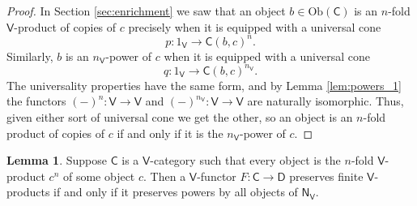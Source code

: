 \documentclass{amsart}
\theoremstyle{definition}
\newtheorem{lemma}[theorem]{Lemma}
\newcommand{\NN}{\mathsf{N}}
\newcommand{\A}{\mathsf{A}}
\newcommand{\V}{\mathsf{V}}
\newcommand{\D}{\mathsf{D}}
\newcommand{\C}{\mathsf{C}}
\newcommand{\op}{\mathrm{op}}
\newcommand{\Obj}{\mathrm{Ob}}
\newcommand{\maps}{\colon}
\begin{document}
\begin{proof}
In Section \ref{sec:enrichment} we saw that an object $b \in \Obj(\C)$ is an $n$-fold $\V$-product of copies of $c$ precisely when it is equipped with a universal cone 
\[        p \maps 1_\V \to \C(b,c)^n . \]
Similarly, $b$ is an $n_\V$-power of $c$ when it is equipped with a universal
cone 
\[       q \maps 1_\V \to \C(b,c)^{n_\V} .\]
The universality properties have the same form, and by Lemma \ref{lem:powers_1} the functors $(-)^n \maps \V\to \V$ and $(-)^{n_\V} \maps \V\to \V$ are naturally isomorphic.   Thus, given either sort of universal cone we get the other, so an object is an $n$-fold product of copies of $c$ if and only if it is the $n_\V$-power of $c$. 
\end{proof}

\iffalse
\begin{lemma}
If $\V$ is a cartesian category with chosen coproducts of the initial object then a
$\V$-category $\C$ has powers by all objects $n_\V$ of $\NN_\V$ if and only $\C^\op$
has finite coproducts.
\end{lemma}

\begin{proof}
Uniqueness holds because $\A_\V$ is skeletal.  We need to show 
that any natural numbers $m,n$ and $a \in \V$ there is an isomorphism
\[     \A_\V(a, (mn)_\V) \cong \A_\V(a,m_\V)^n  .....\]
\[\begin{array}{rcll}
	\underline{\NN}_\V((mn)_\V, a) & \cong & \underline{\NN}_\V(m \cdot n_\V,a) & \text{Lemma \ref{lem:NN}} \\
	&\cong &  a^{m \cdot n_\V} & \text{definition of hom-objects in $\underline{\NN}_\V$} \\
	&\cong & \prod_{i=1}^m a^{n_\V} & \text{exponentiation maps coproducts to products} \\
	&\cong & \prod_{i=1}^m a^n  & \text{Lemma \ref{lem:powers_1}} \\
	&\cong& a^{mn} \\
	&\cong& 
\end{array}
\]
\end{proof}	
\fi


\begin{lemma}
\label{lem:powers_3}
Suppose $\C$ is a $\V$-category such that every object is the $n$-fold $\V$-product $c^n$ of some object $c$.   Then a $\V$-functor $F \maps \C \to \D$ preserves finite $\V$-products if and only if it preserves powers by all objects of $\NN_\V$.
\end{lemma}
\end{document}
